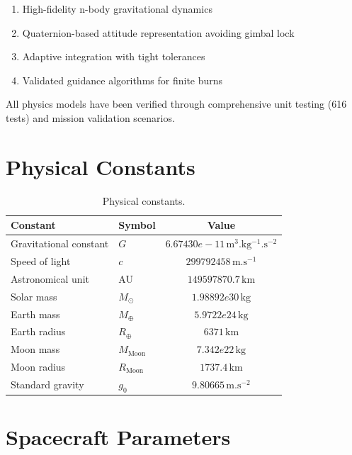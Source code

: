 \documentclass[11pt,a4paper]{article}
\newcommand{\SI}[2]{#1\,\mathrm{#2}}
\begin{document}
\begin{enumerate}
    \item High-fidelity n-body gravitational dynamics
    \item Quaternion-based attitude representation avoiding gimbal lock
    \item Adaptive integration with tight tolerances
    \item Validated guidance algorithms for finite burns
\end{enumerate}

All physics models have been verified through comprehensive unit testing (616 tests) and mission validation scenarios.

\appendix
\section{Physical Constants}

\begin{table}[h]
\centering
\begin{tabular}{llc}
\toprule
\textbf{Constant} & \textbf{Symbol} & \textbf{Value} \\
\midrule
Gravitational constant & $G$ & $\SI{6.67430e-11}{m^3.kg^{-1}.s^{-2}}$ \\
Speed of light & $c$ & $\SI{299792458}{m.s^{-1}}$ \\
Astronomical unit & AU & $\SI{149597870.7}{km}$ \\
Solar mass & $M_\odot$ & $\SI{1.98892e30}{kg}$ \\
Earth mass & $M_\oplus$ & $\SI{5.9722e24}{kg}$ \\
Earth radius & $R_\oplus$ & $\SI{6371}{km}$ \\
Moon mass & $M_\text{Moon}$ & $\SI{7.342e22}{kg}$ \\
Moon radius & $R_\text{Moon}$ & $\SI{1737.4}{km}$ \\
Standard gravity & $g_0$ & $\SI{9.80665}{m.s^{-2}}$ \\
\bottomrule
\end{tabular}
\caption{Physical constants.}
\end{table}

\section{Spacecraft Parameters}
\end{document}
